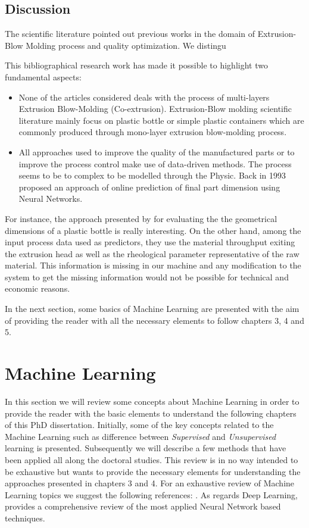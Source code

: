 \subsection{Discussion} \label{Discussion}

The scientific literature pointed out previous works in the domain of Extrusion-Blow Molding process and quality optimization. We distingu 

This bibliographical research work has made it possible to highlight two fundamental aspects:

\begin{itemize}
    \item None of the articles considered deals with the process of multi-layers Extrusion Blow-Molding (Co-extrusion). Extrusion-Blow molding scientific literature mainly focus on plastic bottle or simple plastic containers which are commonly produced through mono-layer extrusion blow-molding process. 
    \item All approaches used to improve the quality of the manufactured parts or to improve the process control make use of data-driven methods. The process seems to be to complex to be modelled through the Physic. Back in 1993 \citep{diraddo1993line} proposed an approach of online prediction of final part dimension using Neural Networks.
\end{itemize}

For instance, the approach presented by \citep{diraddo1993line} for evaluating the the geometrical dimensions of a plastic bottle is really interesting. On the other hand, among the input process data used as predictors, they use the material throughput exiting the extrusion head as well as the rheological parameter representative of the raw material. This information is missing in our machine and any modification to the system to get the missing information would not be possible for technical and economic reasons. 

In the next section, some basics of Machine Learning are presented with the aim of providing the reader with all the necessary elements to follow chapters 3, 4 and 5.

\section{Machine Learning}

In this section we will review some concepts about Machine Learning in order to provide the reader with the basic elements to understand the following chapters of this PhD dissertation. Initially, some of the key concepts related to the Machine Learning such as difference between \textit{Supervised} and \textit{Unsupervised} learning is presented. Subsequently we will describe a few methods that have been applied all along the doctoral studies. This review is in no way intended to be exhaustive but wants to provide the necessary elements for understanding the approaches presented in chapters 3 and 4. For an exhaustive review of Machine Learning topics we suggest the following references: \citep{bishop2006pattern,friedman2017elements}. As regards Deep Learning, \citep{goodfellow2016deep} provides a comprehensive review of the most applied Neural Network based techniques.   

